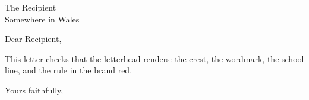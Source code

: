 \documentclass[letter,a4paper,11pt]{bangor}
\begin{document}
\begin{letter}{The Recipient\\Somewhere in Wales}
  \bangorletterhead
  \opening{Dear Recipient,}
  This letter checks that the letterhead renders: the crest, the
  wordmark, the school line, and the rule in the brand red.
  \closing{Yours faithfully,}
\end{letter}
\end{document}
